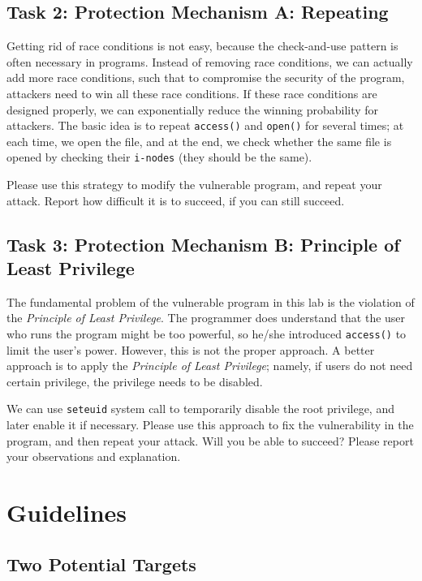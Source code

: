 \subsection{Task 2: Protection Mechanism A: Repeating}

Getting rid of race conditions is not easy, because the check-and-use pattern 
is often necessary in programs. Instead of removing race conditions,
we can actually add more race conditions, such that to compromise the 
security of the program, attackers need to win all these race conditions.
If these race conditions are designed properly, we can exponentially 
reduce the winning probability for attackers. The basic idea is to
repeat {\tt access()} and {\tt open()} for several times; at each time, 
we open the file, and at the end, we check whether the same file is opened
by checking their {\tt i-nodes} (they should be the same).

Please use this strategy to modify the vulnerable program, and repeat 
your attack. Report how difficult it is to succeed, if you can still
succeed.

\subsection{Task 3: Protection Mechanism B: Principle of Least Privilege}

The fundamental problem of the vulnerable program in this lab is 
the violation of the {\em Principle of Least Privilege}. 
The programmer does understand that the user who runs the program 
might be too powerful, so he/she introduced {\tt access()} to limit the user's 
power. However, this is not the proper approach. A better
approach is to apply the {\em Principle of Least Privilege}; 
namely, if users do not need certain privilege, the privilege
needs to be disabled.

We can use {\tt seteuid{}} system call to temporarily disable
the root privilege, and later enable it if necessary. Please use 
this approach to fix the vulnerability in the program, and then
repeat your attack. Will you be able to succeed? Please report your
observations and explanation.



\section{Guidelines} 

\subsection{Two Potential Targets}

